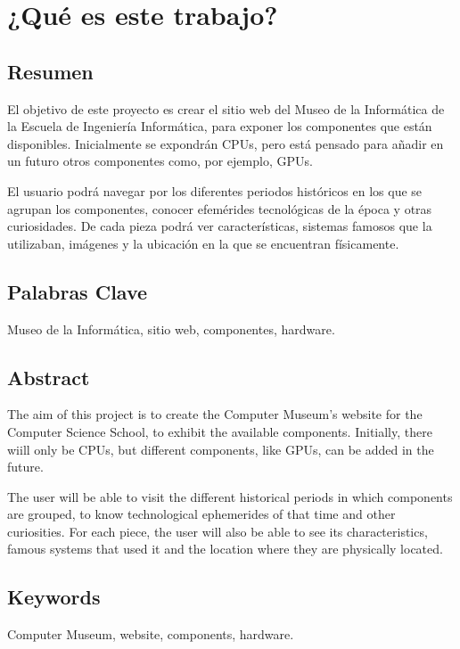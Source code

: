 \newpage
\hypersetup{pageanchor=true}

\newpage
\thispagestyle{empty}
\chapter{¿Qué es este trabajo?}
\section{Resumen}
El objetivo de este proyecto es crear el sitio web del Museo de la Informática de la Escuela de Ingeniería Informática, para exponer los componentes que están disponibles. Inicialmente se expondrán CPUs, pero está pensado para añadir en un futuro otros componentes como, por ejemplo, GPUs.\\
\par
El usuario podrá navegar por los diferentes periodos históricos en los que se agrupan los componentes, conocer efemérides tecnológicas de la época y otras curiosidades. De cada pieza podrá ver características, sistemas famosos que la utilizaban, imágenes y la ubicación en la que se encuentran físicamente.
\newpage
\section{Palabras Clave}
Museo de la Informática, sitio web, componentes, hardware.
\pagestyle{fancy}
\newpage
\section{Abstract}
The aim of this project is to create the Computer Museum's website for the Computer Science School, to exhibit the available components. Initially, there wiill only be CPUs, but different components, like GPUs, can be added in the future.\\
\par
The user will be able to visit the different historical periods  in which components are grouped, to know technological ephemerides of that time and other curiosities. For each piece, the user will also be able to see its characteristics, famous systems that used it and the location where they are physically located.
\pagestyle{fancy}
\newpage
\section{Keywords}
Computer Museum, website, components, hardware.